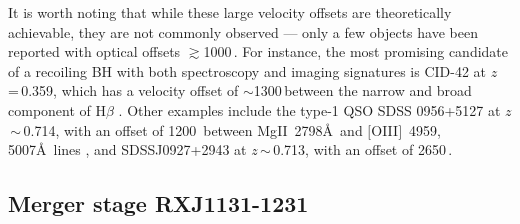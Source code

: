 \documentclass[]{emulateapj}
\begin{document}
It is worth noting that
while these large velocity offsets are theoretically achievable,
they are not commonly observed --- only a few objects have been reported with optical offsets $\gtrsim$1000\,\kms.  
For instance,
the most promising candidate of a recoiling BH with both spectroscopy and imaging
signatures is CID-42 at $z$\,=\,0.359, which has 
a velocity offset of $\sim$1300\,\kms between the narrow and broad component of H$\beta$ \citep{Civano10a}. 
Other examples include 
the type-1 QSO SDSS 0956+5127 at $z$\,$\sim$\,0.714, with an offset of 1200\,\kms
between Mg{\scriptsize II}~2798\AA\ and $[$O{\scriptsize III}$]$~4959, 5007\AA\ lines 
\citep{Steinhardt12a}, 
and
SDSSJ0927+2943 at $z$\,$\sim$\,0.713, with an offset of 2650\,\kms \citep{Komossa08a}.

\subsection{Merger stage RXJ1131-1231}
\end{document}
